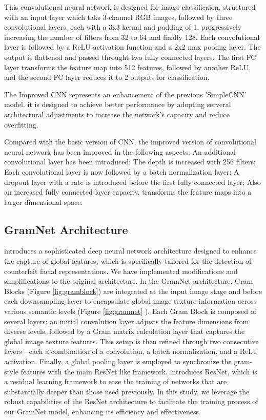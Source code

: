 \documentclass[rebuttal]{cvpr}
\begin{document}
This convolutional neural network is designed for image classificaion, structured with an input layer which taks 3-channel RGB images, followed by three convolutional layers, each with a 3x3 kernal and padding of 1, progressively increasing the number of filters from 32 to 64 and finally 128. Each convolutional layer is followed by a ReLU activation function and a 2x2 max pooling layer. The output is flattened and passed throught two fully connected layers. The first FC layer transforms the feature map into 512 features, followed by another ReLU, and the second FC layer reduces it to 2 outputs for classification. 

The Improved CNN represents an enhancement of the previous 'SimpleCNN' model. it is designed to achieve better performance by adopting serveral architectural adjustments to increase the network's capacity and reduce overfitting.

Compared with the basic version of CNN, the improved version of convolutional neural network has been improved in the following aspects: An additional convolutional layer has been introduced; The depth is increased with 256 filters; Each convolutional layer is now followed by a batch normalization layer; A dropout layer with a rate is introduced before the first fully connected layer; Also an increased fully connected layer capacity, transforms the feature maps into a larger dimensional space.

\subsection{GramNet Architecture}
\cite{liu2020global} introduces a sophisticated deep neural network architecture designed to enhance the capture of global features, which is specifically tailored for the detection of counterfeit facial representations. We have implemented modifications and simplifications to the original architecture. In the GramNet architecture, Gram Blocks (Figure \ref{fig:gramblock}) are integrated at the input image stage and before each downsampling layer to encapsulate global image texture information across various semantic levels (Figure \ref{fig:gramnet} ). Each Gram Block is composed of several layers: an initial convolution layer adjusts the feature dimensions from diverse levels, followed by a Gram matrix calculation layer that captures the global image texture features. This setup is then refined through two consecutive layers—each a combination of a convolution, a batch normalization, and a ReLU activation. Finally, a global pooling layer is employed to synchronize the gram-style features with the main ResNet like framework. \cite{he2015deep} introduces ResNet, which is a residual learning framework to ease the training of networks that are substantially deeper than those used previously. In this study, we leverage the robust capabilities of the ResNet architecture to facilitate the training process of our GramNet model, enhancing its efficiency and effectiveness.
\end{document}
